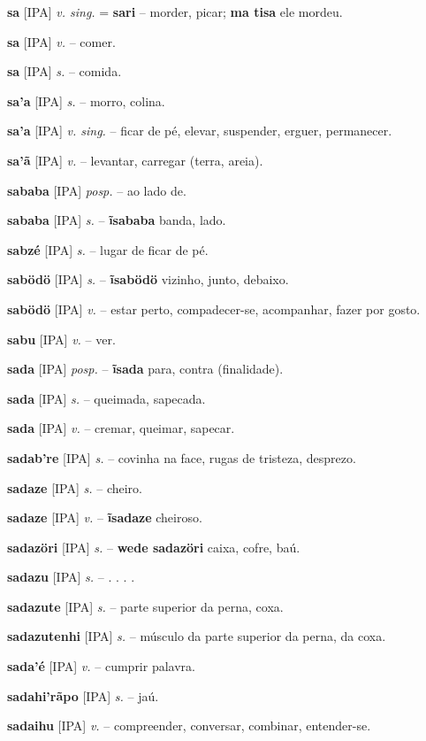 \textbf{sa} [IPA] \textit{v. sing.} = \textbf{sari} -- morder, picar; \textbf{ma tisa} ele mordeu.

\textbf{sa} [IPA] \textit{v.} -- comer.

\textbf{sa} [IPA] \textit{s.} -- comida.

\textbf{sa'a} [IPA] \textit{s.} -- morro, colina.

\textbf{sa'a} [IPA] \textit{v. sing.} -- ficar de pé, elevar, suspender, erguer, permanecer.

\textbf{sa'ã} [IPA] \textit{v.} -- levantar, carregar (terra, areia).

\textbf{sababa} [IPA] \textit{posp.} -- ao lado de.

\textbf{sababa} [IPA] \textit{s.} -- \textbf{ĩsababa} banda, lado.

\textbf{sabzé} [IPA] \textit{s.} -- lugar de ficar de pé.

\textbf{sabödö} [IPA] \textit{s.} -- \textbf{ĩsabödö} vizinho, junto, debaixo.

\textbf{sabödö} [IPA] \textit{v.} -- estar perto, compadecer-se, acompanhar, fazer por gosto.

\textbf{sabu} [IPA] \textit{v.} -- ver.

\textbf{sada} [IPA] \textit{posp.} -- \textbf{ĩsada} para, contra (finalidade).

\textbf{sada} [IPA] \textit{s.} -- queimada, sapecada.

\textbf{sada} [IPA] \textit{v.} -- cremar, queimar, sapecar.

\textbf{sadab're} [IPA] \textit{s.} -- covinha na face, rugas de tristeza, desprezo.

\textbf{sadaze} [IPA] \textit{s.} -- cheiro.

\textbf{sadaze} [IPA] \textit{v.} -- \textbf{ĩsadaze} cheiroso.

\textbf{sadazöri} [IPA] \textit{s.} -- \textbf{wede sadazöri} caixa, cofre, baú.

\textbf{sadazu} [IPA] \textit{s.} -- . . . .

\textbf{sadazute} [IPA] \textit{s.} -- parte superior da perna, coxa.

\textbf{sadazutenhi} [IPA] \textit{s.} -- músculo da parte superior da perna, da coxa.

\textbf{sada'é} [IPA] \textit{v.} -- cumprir palavra.

\textbf{sadahi'rãpo} [IPA] \textit{s.} -- jaú.

\textbf{sadaihu} [IPA] \textit{v.} -- compreender, conversar, combinar, entender-se.

